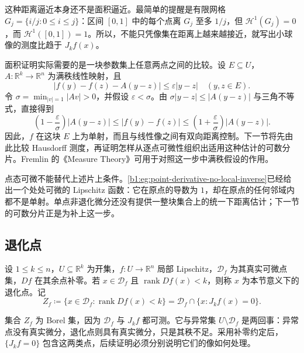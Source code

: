 \ProseParagraphBreak

这种距离逼近本身还不是面积逼近。最简单的提醒是有限网格 \(G_j=\{i/j:0\leq i\leq j\}\)：区间 \([0,1]\) 中的每个点离 \(G_j\) 至多 \(1/j\)，但 \(\mathcal H^1(G_j)=0\)，而 \(\mathcal H^1([0,1])=1\)。所以，不能只凭像集在距离上越来越接近，就写出小球像的测度比趋于 \(J_k f(x)\)。

\ProseParagraphBreak

面积证明实际需要的是一块参数集上任意两点之间的比较。设 \(E\subseteq U\)，\(A:\mathbb R^k\to\mathbb R^n\) 为满秩线性映射，且
\[
|f(y)-f(z)-A(y-z)|\leq\varepsilon|y-z|
\quad(y,z\in E).
\]
令 \(\sigma=\min_{|v|=1}|Av|>0\)，并假设 \(\varepsilon<\sigma\)。由 \(\sigma|y-z|\leq|A(y-z)|\) 与三角不等式，直接得到
\[
\left(1-\frac\varepsilon\sigma\right)|A(y-z)|
\leq|f(y)-f(z)|
\leq\left(1+\frac\varepsilon\sigma\right)|A(y-z)|.
\]
因此，\(f\) 在这块 \(E\) 上为单射，而且与线性像之间有双向距离控制。下一节将先由此比较 Hausdorff 测度，再证明怎样从逐点可微性组织出适用这种估计的可数分片。Fremlin 的《Measure Theory》\cite[265D]{Fremlin2016Measure}可用于对照这一步中满秩假设的作用。

\ProseParagraphBreak

点态可微不能替代上述片上条件。\cref{b1:eg:point-derivative-no-local-inverse}已经给出一个处处可微的 Lipschitz 函数：它在原点的导数为 \(1\)，却在原点的任何邻域内都不是单射。单点非退化微分还没有提供一整块集合上的统一下距离估计；下一节的可数分片正是为补上这一步。

\subsection{退化点}
\label{b1:subsec:170203}

\begin{definition}
\label{b1:def:jacobian-degenerate-set}
设 \(1\le k\le n\)，\(U\subseteq\mathbb R^k\) 为开集，\(f:U\to\mathbb R^n\) 局部 Lipschitz，\(\mathcal D_f\) 为其真实可微点集，\(Df\) 在其余点补零。若 \(x\in\mathcal D_f\) 且 \(\operatorname{rank}Df(x)<k\)，则称 \(x\) 为本节意义下的退化点。记
\[
Z_f\coloneqq\{x\in\mathcal D_f:\operatorname{rank}Df(x)<k\}
=\mathcal D_f\cap\{x:J_k f(x)=0\}.
\]
\end{definition}

集合 \(Z_f\) 为 Borel 集，因为 \(\mathcal D_f\) 与 \(J_k f\) 都可测。它与异常集 \(U\setminus\mathcal D_f\) 是两回事：异常点没有真实微分，退化点则具有真实微分，只是其秩不足。采用补零约定后，\(\{J_k f=0\}\) 包含这两类点，后续证明必须分别说明它们的像如何处理。

\ProseParagraphBreak

